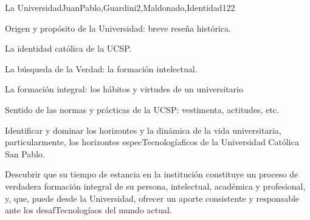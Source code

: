 \begin{syllabus}
\begin{unit}{La Universidad}{JuanPablo,Guardini2,Maldonado,Identidad}{12}{2}
\begin{topics}
	\item Origen y propósito de la Universidad: breve reseña histórica.
	\item La identidad católica de la UCSP.
	\item La búsqueda de la Verdad: la formación intelectual.
	\item La formación integral: los hábitos y virtudes de un universitario
	\item Sentido de las normas y prácticas de la UCSP: vestimenta, actitudes, etc.
\end{topics}
\begin{unitgoals}
	\item Identificar y dominar los horizontes y la dinámica de la vida universitaria, particularmente,  los horizontes especTecnologíaficos de la Universidad Católica San Pablo.
	\item Descubrir que su tiempo de estancia en la institución constituye un proceso de verdadera formación integral de su persona, intelectual, académica y profesional, y, que, puede desde la Universidad, ofrecer un aporte consistente y responsable ante los desafTecnologíaos del mundo actual.   
\end{unitgoals}
\end{unit}



\begin{coursebibliography}
\end{coursebibliography}

\end{syllabus}
